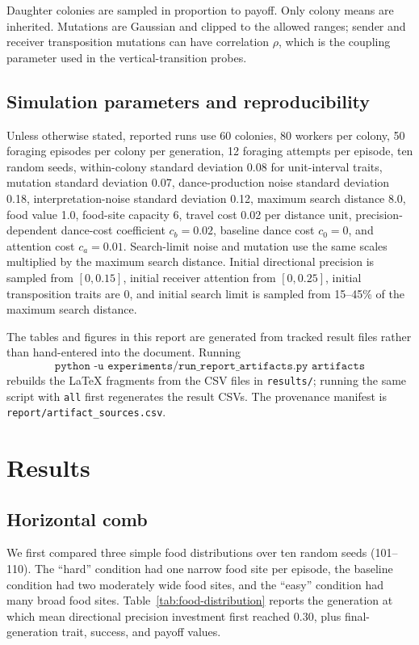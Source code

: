 \documentclass[11pt]{article}
\begin{document}
Daughter colonies are sampled in proportion to payoff. Only colony means are
inherited. Mutations are Gaussian and clipped to the allowed ranges; sender and
receiver transposition mutations can have correlation $\rho$, which is the
coupling parameter used in the vertical-transition probes.

\subsection{Simulation parameters and reproducibility}

Unless otherwise stated, reported runs use 60 colonies, 80 workers per colony,
50 foraging episodes per colony per generation, 12 foraging attempts per
episode, ten random seeds, within-colony standard deviation 0.08 for
unit-interval traits, mutation standard deviation 0.07, dance-production noise
standard deviation 0.18, interpretation-noise standard deviation 0.12, maximum
search distance 8.0, food value 1.0, food-site capacity 6, travel cost 0.02
per distance unit, precision-dependent dance-cost coefficient $c_b=0.02$,
baseline dance cost $c_0=0$, and attention cost $c_a=0.01$. Search-limit noise
and mutation use the same scales multiplied by the maximum search distance.
Initial directional precision is sampled from $[0,0.15]$, initial receiver
attention from $[0,0.25]$, initial transposition traits are 0, and initial
search limit is sampled from 15--45\% of the maximum search distance.

The tables and figures in this report are generated from tracked result files
rather than hand-entered into the document. Running
\[
\texttt{python -u experiments/run\_report\_artifacts.py artifacts}
\]
rebuilds the LaTeX fragments from the CSV files in \texttt{results/}; running
the same script with \texttt{all} first regenerates the result CSVs. The
provenance manifest is \texttt{report/artifact\_sources.csv}.

\section{Results}

\subsection{Horizontal comb}

We first compared three simple food distributions over ten random seeds
(101--110). The ``hard'' condition had one narrow food site per episode, the
baseline condition had two moderately wide food sites, and the ``easy''
condition had many broad food sites. Table~\ref{tab:food-distribution} reports
the generation at which mean directional precision investment first reached
0.30, plus final-generation trait, success, and payoff values.
\end{document}
